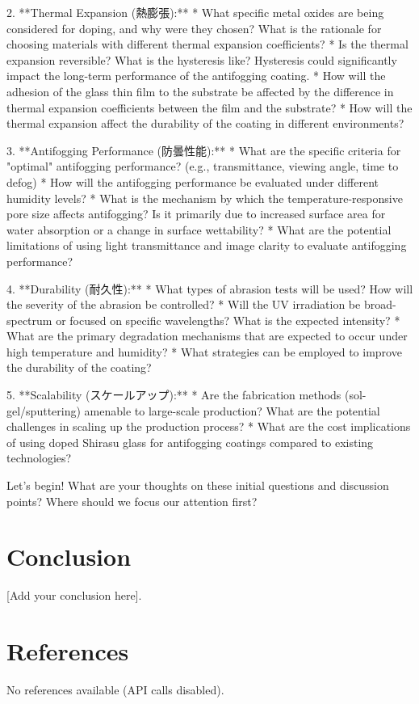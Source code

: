 \documentclass{article}
\begin{document}
2.  **Thermal Expansion (熱膨張):**
    *   What specific metal oxides are being considered for doping, and why were they chosen?  What is the rationale for choosing materials with different thermal expansion coefficients?
    *   Is the thermal expansion reversible?  What is the hysteresis like?  Hysteresis could significantly impact the long-term performance of the antifogging coating.
    *   How will the adhesion of the glass thin film to the substrate be affected by the difference in thermal expansion coefficients between the film and the substrate?
    *   How will the thermal expansion affect the durability of the coating in different environments?

3.  **Antifogging Performance (防曇性能):**
    *   What are the specific criteria for "optimal" antifogging performance? (e.g., transmittance, viewing angle, time to defog)
    *   How will the antifogging performance be evaluated under different humidity levels?
    *   What is the mechanism by which the temperature-responsive pore size affects antifogging? Is it primarily due to increased surface area for water absorption or a change in surface wettability?
    *   What are the potential limitations of using light transmittance and image clarity to evaluate antifogging performance?

4.  **Durability (耐久性):**
    *   What types of abrasion tests will be used? How will the severity of the abrasion be controlled?
    *   Will the UV irradiation be broad-spectrum or focused on specific wavelengths? What is the expected intensity?
    *   What are the primary degradation mechanisms that are expected to occur under high temperature and humidity?
    *   What strategies can be employed to improve the durability of the coating?

5.  **Scalability (スケールアップ):**
    *   Are the fabrication methods (sol-gel/sputtering) amenable to large-scale production? What are the potential challenges in scaling up the production process?
    *   What are the cost implications of using doped Shirasu glass for antifogging coatings compared to existing technologies?

Let's begin!  What are your thoughts on these initial questions and discussion points?  Where should we focus our attention first?


\section{Conclusion}
[Add your conclusion here].

\section{References}
No references available (API calls disabled).
\end{document}
